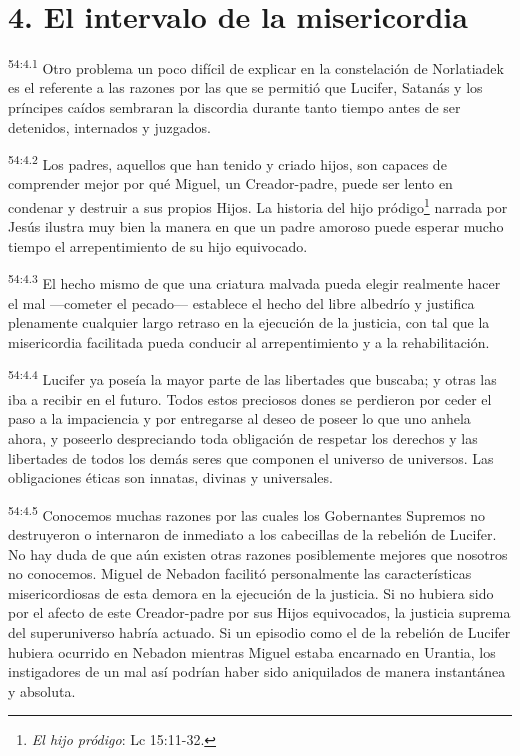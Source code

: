 \section*{4. El intervalo de la misericordia}
\par
\textsuperscript{54:4.1} Otro problema un poco difícil de explicar en la constelación de Norlatiadek es el referente a las razones por las que se permitió que Lucifer, Satanás y los príncipes caídos sembraran la discordia durante tanto tiempo antes de ser detenidos, internados y juzgados.

\par
\textsuperscript{54:4.2} Los padres, aquellos que han tenido y criado hijos, son capaces de comprender mejor por qué Miguel, un Creador-padre, puede ser lento en condenar y destruir a sus propios Hijos. La historia del hijo pródigo\footnote{\textit{El hijo pródigo}: Lc 15:11-32.} narrada por Jesús ilustra muy bien la manera en que un padre amoroso puede esperar mucho tiempo el arrepentimiento de su hijo equivocado.

\par
\textsuperscript{54:4.3} El hecho mismo de que una criatura malvada pueda elegir realmente hacer el mal ---cometer el pecado--- establece el hecho del libre albedrío y justifica plenamente cualquier largo retraso en la ejecución de la justicia, con tal que la misericordia facilitada pueda conducir al arrepentimiento y a la rehabilitación.

\par
\textsuperscript{54:4.4} Lucifer ya poseía la mayor parte de las libertades que buscaba; y otras las iba a recibir en el futuro. Todos estos preciosos dones se perdieron por ceder el paso a la impaciencia y por entregarse al deseo de poseer lo que uno anhela ahora, y poseerlo despreciando toda obligación de respetar los derechos y las libertades de todos los demás seres que componen el universo de universos. Las obligaciones éticas son innatas, divinas y universales.

\par
\textsuperscript{54:4.5} Conocemos muchas razones por las cuales los Gobernantes Supremos no destruyeron o internaron de inmediato a los cabecillas de la rebelión de Lucifer. No hay duda de que aún existen otras razones posiblemente mejores que nosotros no conocemos. Miguel de Nebadon facilitó personalmente las características misericordiosas de esta demora en la ejecución de la justicia. Si no hubiera sido por el afecto de este Creador-padre por sus Hijos equivocados, la justicia suprema del superuniverso habría actuado. Si un episodio como el de la rebelión de Lucifer hubiera ocurrido en Nebadon mientras Miguel estaba encarnado en Urantia, los instigadores de un mal así podrían haber sido aniquilados de manera instantánea y absoluta.

